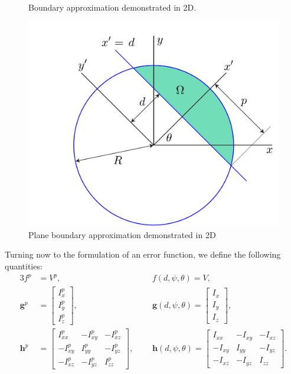 \begin{figure}[ht]
{\label{fig:subfigure6}}

\caption{Boundary approximation demonstrated in 2D.}
\label{fig:figure3}
\end{figure}

\begin{figure}[h]
	\centering
		\includegraphics[scale=0.3]{media/om/window.pdf}
	\caption{Plane boundary approximation demonstrated in 2D}
	\label{fig:quad}
\end{figure}
%
\noindent Turning now to the formulation of an error function, we define the following quantities:
\begin{alignat}{3}
f^p &= V^p, \text{\ \ \ \ \ }&&f(d,\psi,\theta) = V, \\
\bm{g}^p &= \left[\begin{array} {ccc} {I_x^p} \\ {I_y^p} \\ {I_z^p} \end{array} \right], \text{\ \ \ \ \ }&&\bm{g}(d,\psi,\theta) = \left[\begin{array} {ccc} {I_x} \\ {I_y} \\ {I_z} \end{array} \right], \\
\bm{h}^p &= \left[\begin{array} {ccc} {I_{xx}^p} & {-I_{xy}^p} & {-I_{xz}^p}\\ {-I_{xy}^p} & {I_{yy}^p} & {-I_{yz}^p} \\ -{I_{xz}^p} & {-I_{yz}^p} & {I_{zz}^p} \end{array} \right],\text{\ \ \ \ \ \ \ }&&\bm{h}(d,\psi,\theta) = \left[\begin{array} {ccc} {I_{xx}} & {-I_{xy}} & {-I_{xz}}\\ {-I_{xy}} & {I_{yy}} & {-I_{yz}} \\ -{I_{xz}} & {-I_{yz}} & {I_{zz}} \end{array} \right].
\end{alignat}
